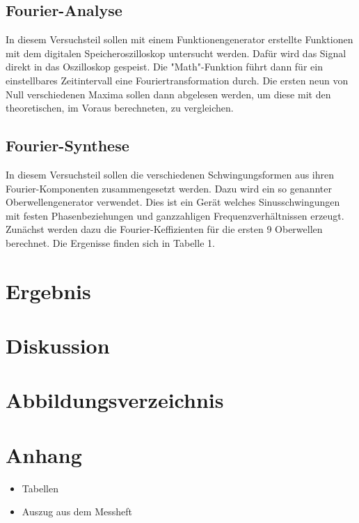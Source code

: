 \documentclass[11pt,ngerman,a4paper]{article}
\begin{document}
\subsection{Fourier-Analyse}
In diesem Versuchsteil sollen mit einem Funktionengenerator erstellte Funktionen mit dem digitalen Speicheroszilloskop untersucht werden. Dafür wird das Signal direkt in das Oszilloskop gespeist. Die "Math"-Funktion führt dann für ein einstellbares Zeitintervall eine Fouriertransformation durch. Die ersten neun von Null verschiedenen Maxima sollen dann abgelesen werden, um diese mit den theoretischen, im Voraus berechneten, zu vergleichen.
\subsection{Fourier-Synthese}

In diesem Versuchsteil sollen die verschiedenen Schwingungsformen aus ihren Fourier-Komponenten zusammengesetzt werden. Dazu wird ein so genannter Oberwellengenerator verwendet. Dies ist ein Ger\"at welches Sinusschwingungen mit festen Phasenbeziehungen und ganzzahligen Frequenzverh\"altnissen erzeugt. Zun\"achst werden dazu die Fourier-Keffizienten f\"ur die ersten 9 Oberwellen berechnet. Die Ergenisse finden sich in Tabelle 1.

\section{Ergebnis}

\section{Diskussion}
\section{Abbildungsverzeichnis}
\section{Anhang}
\begin{itemize}
\item Tabellen
\item Auszug aus dem Messheft
\end{itemize}
\end{document}
